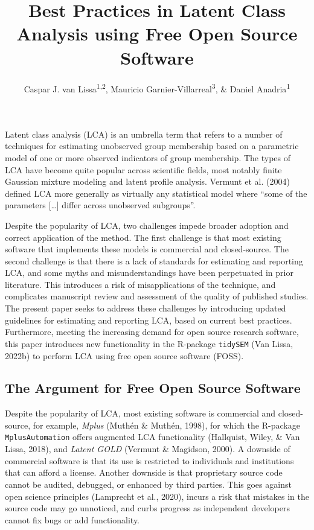 \documentclass[
  ,man,floatsintext]{apa6}
\title{Best Practices in Latent Class Analysis using Free Open Source Software}
\author{Caspar J. van Lissa\textsuperscript{1,2}, Mauricio Garnier-Villarreal\textsuperscript{3}, \& Daniel Anadria\textsuperscript{1}}
\date{}
\affiliation{\vspace{0.5cm}\textsuperscript{1} Utrecht University, Methodology \& Statistics\\\textsuperscript{2} Open Science Community Utrecht\\\textsuperscript{3} Vrije Universiteit Amsterdam, Sociology}
\begin{document}
\maketitle

Latent class analysis (LCA) is an umbrella term that refers to a number
of techniques for estimating unobserved group membership based on a
parametric model of one or more observed indicators of group membership.
The types of LCA have become quite popular across scientific fields,
most notably finite Gaussian mixture modeling and latent profile
analysis. Vermunt et al. (2004) defined LCA more generally as
virtually any statistical model where ``some of the parameters {[}\ldots{]}
differ across unobserved subgroups''.

Despite the popularity of LCA,
two challenges impede broader adoption and correct application of the method.
The first challenge is that most existing software that implements these models is commercial and closed-source.
The second challenge is that there is a lack of standards for estimating and reporting LCA, and some myths and misunderstandings have been perpetuated in prior literature.
This introduces a risk of misapplications of the technique,
and complicates manuscript review and assessment of the quality of published studies.
The present paper seeks to address these challenges by introducing updated guidelines for estimating and reporting LCA,
based on current best practices.
Furthermore, meeting the increasing demand for open source research software,
this paper introduces new functionality in the R-package \texttt{tidySEM} (Van Lissa, 2022b) to perform LCA using free open source software (FOSS).

\hypertarget{the-argument-for-free-open-source-software}{%
\subsection{The Argument for Free Open Source Software}\label{the-argument-for-free-open-source-software}}

Despite the popularity of LCA,
most existing software is commercial and closed-source,
for example, \emph{Mplus} (Muthén \& Muthén, 1998), for which the R-package \texttt{MplusAutomation} offers augmented LCA functionality (Hallquist, Wiley, \& Van Lissa, 2018), and \emph{Latent GOLD} (Vermunt \& Magidson, 2000).
A downside of commercial software is that its use is restricted to individuals and institutions that can afford a license.
Another downside is that proprietary source code cannot be audited, debugged, or enhanced by third parties.
This goes against open science principles (Lamprecht et al., 2020),
incurs a risk that mistakes in the source code may go unnoticed,
and curbs progress as independent developers cannot fix bugs or add functionality.
\end{document}
